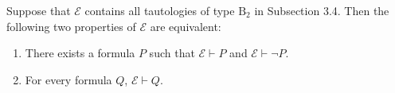Suppose that $\mathcal{E}$ contains all tautologies of type $\text{B}_2$ in Subsection 3.4. Then the following two properties of $\mathcal{E}$ are equivalent:

\begin{enumerate}
\item[(a)] There exists a formula $P$ such that $\mathcal{E} \vdash P$ and $\mathcal{E} \vdash \neg P$.
\item[(b)] For every formula $Q$, $\mathcal{E} \vdash Q$.
\end{enumerate}
